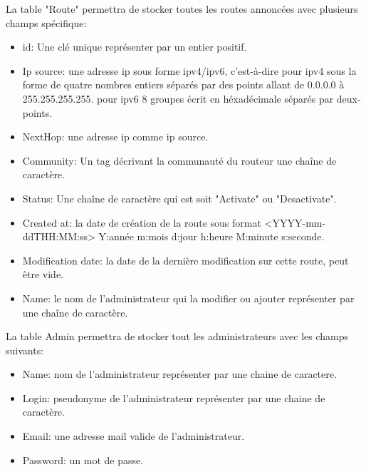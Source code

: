 La table "Route" permettra de stocker toutes les routes annoncées avec plusieurs champs spécifique:
\begin{itemize}
\item id: Une clé unique représenter par un entier positif.
\item Ip source: une adresse ip sous forme ipv4/ipv6, c'est-à-dire pour ipv4 sous la forme de quatre nombres entiers séparés par des points allant de 0.0.0.0 à 255.255.255.255. pour ipv6 8 groupes écrit en héxadécimale séparés par deux-points.
\item NextHop: une adresse ip comme ip source.
\item Community: Un tag décrivant la communauté du routeur une chaîne de caractère.
\item Status: Une chaîne de caractère qui est soit "Activate" ou "Desactivate".
\item Created at: la date de création de la route sous format <YYYY-mm-ddTHH:MM:ss> Y:année m:mois d:jour h:heure M:minute s:seconde.
\item Modification date: la date de la dernière modification sur cette route, peut être vide.
\item Name: le nom de l'administrateur qui la modifier ou ajouter représenter par une chaîne de caractère.
\end{itemize}

La table Admin permettra de stocker tout les administrateurs avec les champs suivants:
\begin{itemize}
\item Name: nom de l'administrateur représenter par une chaine de caractere.
\item Login: pseudonyme de l'administrateur représenter par une chaine de caractère.
\item Email:  une adresse mail valide de l'administrateur.
\item Password: un mot de passe.
\end{itemize}